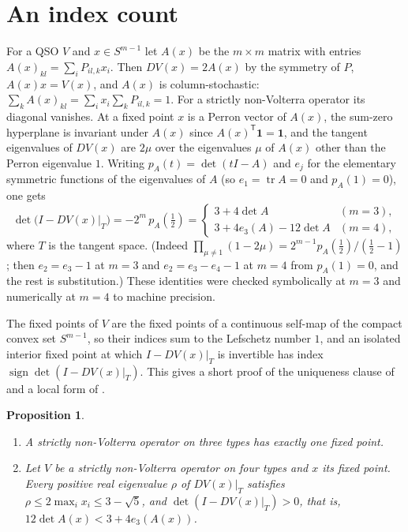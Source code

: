 \documentclass[11pt]{amsart}
\newtheorem{proposition}[theorem]{Proposition}
\theoremstyle{definition}
\newcommand{\Simp}{S^{m-1}}
\DeclareMathOperator{\tr}{tr}
\begin{document}
\section{An index count}\label{sec:index}

For a QSO $V$ and $x\in\Simp$ let $A(x)$ be the $m\times m$ matrix with entries $A(x)_{kl}=\sum_iP_{il,k}x_i$. Then $DV(x)=2A(x)$ by the symmetry of $P$, $A(x)x=V(x)$, and $A(x)$ is column-stochastic: $\sum_kA(x)_{kl}=\sum_ix_i\sum_kP_{il,k}=1$. For a strictly non-Volterra operator its diagonal vanishes. At a fixed point $x$ is a Perron vector of $A(x)$, the sum-zero hyperplane is invariant under $A(x)$ since $A(x)^{\mathsf T}\mathbf 1=\mathbf 1$, and the tangent eigenvalues of $DV(x)$ are $2\mu$ over the eigenvalues $\mu$ of $A(x)$ other than the Perron eigenvalue $1$. Writing $p_A(t)=\det(tI-A)$ and $e_j$ for the elementary symmetric functions of the eigenvalues of $A$ (so $e_1=\tr A=0$ and $p_A(1)=0$), one gets
\begin{equation}\label{eq:index}
\det\big(I-DV(x)\big|_{T}\big)=-2^m\,p_A(\tfrac12)=
\begin{cases}3+4\det A & (m=3),\\[2pt] 3+4e_3(A)-12\det A & (m=4),\end{cases}
\end{equation}
where $T$ is the tangent space. (Indeed $\prod_{\mu\ne1}(1-2\mu)=2^{m-1}p_A(\frac12)/(\frac12-1)$; then $e_2=e_3-1$ at $m=3$ and $e_2=e_3-e_4-1$ at $m=4$ from $p_A(1)=0$, and the rest is substitution.) These identities were checked symbolically at $m=3$ and numerically at $m=4$ to machine precision.

The fixed points of $V$ are the fixed points of a continuous self-map of the compact convex set $\Simp$, so their indices sum to the Lefschetz number $1$, and an isolated interior fixed point at which $I-DV(x)|_T$ is invertible has index $\operatorname{sign}\det(I-DV(x)|_T)$. This gives a short proof of the uniqueness clause of  and a local form of .

\begin{proposition}\label{prop:index}
\leavevmode
\begin{enumerate}
\item[(i)] A strictly non-Volterra operator on three types has exactly one fixed point.
\item[(ii)] Let $V$ be a strictly non-Volterra operator on four types and $x$ its fixed point. Every positive real eigenvalue $\rho$ of $DV(x)|_T$ satisfies $\rho\le2\max_ix_i\le3-\sqrt5$, and $\det(I-DV(x)|_T)>0$, that is, $12\det A(x)<3+4e_3(A(x))$.
\end{enumerate}
\end{proposition}
\end{document}
